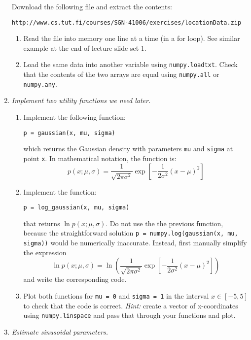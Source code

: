 \documentclass[a4paper,12pt]{scrartcl}
\newcommand{\python}{{\fbox{\texttt{\bfseries python}}\quad}}
\begin{document}
\begin{enumerate}
Download the following file and extract the contents:
{\small
\begin{verbatim}
http://www.cs.tut.fi/courses/SGN-41006/exercises/locationData.zip
\end{verbatim}
}
\label{ex1}

\begin{enumerate}
\item Read the file into memory one line at a time (in a for loop). See similar example at the end of lecture slide set 1.
\item Load the same data into another variable using \verb+numpy.loadtxt+. Check that the contents of the 
two arrays are equal using \verb+numpy.all+ or \verb+numpy.any+.
\end{enumerate}

\item \python \emph{Implement two utility functions we need later.}

\begin{enumerate}
\item Implement the following function:
\begin{verbatim}
p = gaussian(x, mu, sigma)
\end{verbatim}
which returns the Gaussian density with parameters \verb+mu+ and \verb+sigma+ at point \verb+x+.
In mathematical notation, the function is:
\[
p(x; \mu,\sigma) = \frac{1}{\sqrt{2\pi\sigma^2}}\exp\left[-\frac{1}{2\sigma^2} (x-\mu)^2\right]
\]
\item Implement the function:
\begin{verbatim}
p = log_gaussian(x, mu, sigma)
\end{verbatim}
that returns $\ln p(x; \mu,\sigma)$. Do not use the the previous function, because 
the straightforward solution \verb+p = numpy.log(gaussian(x, mu, sigma))+ would be numerically inaccurate.
Instead, first manually simplify the expression 
\[
\ln p(x; \mu,\sigma) = \ln\left(\frac{1}{\sqrt{2\pi\sigma^2}}\exp\left[-\frac{1}{2\sigma^2} (x-\mu)^2\right]\right)
\]
and write the corresponding code.
\item Plot both functions for \verb+mu = 0+ and \verb+sigma = 1+ in the interval
$x\in [-5,5]$ to check that the code is correct. \emph{Hint:} create a vector
of x-coordinates using \verb+numpy.linspace+ and pass that through your functions
and plot.
\end{enumerate}

\item \python \emph{Estimate sinusoidal parameters.}


\end{enumerate}
\end{document}
